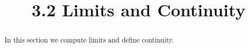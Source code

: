 \documentclass[handout]{ximera}
\title{3.2 Limits and Continuity}
\begin{document}
\begin{abstract}
In this section we compute limits and define continuity.
\end{abstract}

\maketitle
\end{document}
